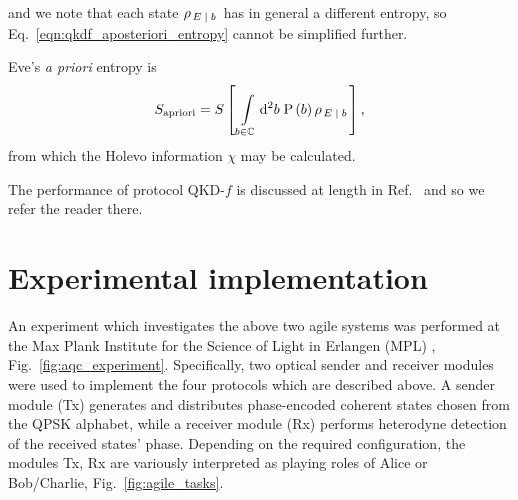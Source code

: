 \noindent and we note that each state $\rho_{\left.E\; \middle| \; b \right.}$ has in general a different entropy, so Eq.~\ref{eqn:qkdf_aposteriori_entropy} cannot be simplified further. 

Eve's \emph{a priori} entropy is
\begin{equation}\label{eqn:qkdf_apriori_entropy}
S_{\text{apriori}} = S\left[\, \int\limits_{b \in \mathbb{C}} \mathop{}\!\mathrm{d^2} b \; \text{P}\left(b\right) \rho_{\left. E \; \middle| \; b \right.}\right],
\end{equation}
from which the Holevo information $\chi$ may be calculated.

The performance of protocol QKD-$f$ is discussed at length in Ref.~\cite{Papanstasiou2018} and so we refer the reader there. 



\section{Experimental implementation}\label{sec:aqc_experiment}

An experiment which investigates the above two agile systems was performed at the Max Plank Institute for the Science of Light in Erlangen (MPL) \cite{Richter2020}, Fig.~\ref{fig:aqc_experiment}. Specifically, two optical sender and receiver modules were used to implement the four protocols which are described above. A sender module (Tx) generates and distributes phase-encoded coherent states chosen from the QPSK alphabet, while a receiver module (Rx) performs heterodyne detection of the received states' phase. Depending on the required configuration, the modules Tx, Rx are variously interpreted as playing roles of Alice or Bob/Charlie, Fig.~\ref{fig:agile_tasks}. 

